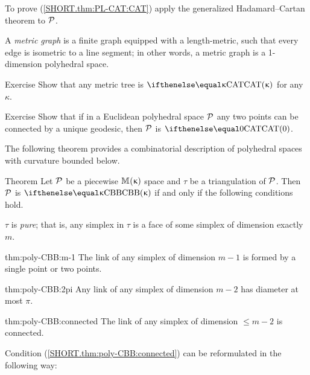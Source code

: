 To prove (\ref{SHORT.thm:PL-CAT:CAT}) apply the generalized Hadamard--Cartan theorem to $\mathcal{P}$.
\qeds

A \emph{metric graph} is a finite graph equipped with a length-metric, such that every edge is isometric to a line segment;
in other words, a metric graph is a 1-dimension polyhedral space.

\begin{thm}{Exercise}\label{ex:metric tree}
Show that any metric tree is $\CAT\kappa$ for any $\kappa$.
\end{thm}


\begin{thm}{Exercise}\label{ex:poly-unique-geodesic}
Show that if in a Euclidean polyhedral space $\mathcal{P}$
any two points can be connected by a unique geodesic,  
then $\mathcal{P}$ is $\CAT0$.
\end{thm}

The following theorem provides a combinatorial description of polyhedral spaces with curvature bounded below.

\begin{thm}{Theorem}\label{thm:poly-CBB} Let $\mathcal{P}$ be a piecewise
$\mathbb{M}_{{}}^{}({\upkappa})$ space and $\tau$ be a triangulation of $\mathcal{P}$.
Then $\mathcal{P}$ is $\Alex\kappa$ if and only if the following conditions hold.

\begin{subthm}{} $\tau$ is \emph{pure}; 
that is, any simplex in $\tau$ is  a face of some simplex of dimension exactly $m$. 
\end{subthm}

\begin{subthm}{thm:poly-CBB:m-1}
The link of any simplex of dimension $m-1$ is formed by a single point or two points.
\end{subthm}

\begin{subthm}{thm:poly-CBB:2pi}
Any link of any simplex of dimension $m-2$
has diameter at most $\pi$.
\end{subthm}

\begin{subthm}{thm:poly-CBB:connected}
The link of any simplex of dimension $\le m-2$ is connected.
\end{subthm}

\end{thm}

Condition (\ref{SHORT.thm:poly-CBB:connected})
can be reformulated in the following way:

